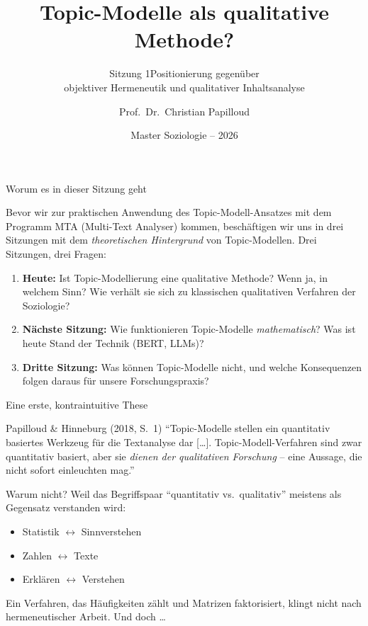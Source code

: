 \documentclass[aspectratio=169,11pt]{beamer}
\title{Topic-Modelle als qualitative Methode?}
\subtitle{Sitzung 1\mdash{}Positionierung gegenüber\\objektiver Hermeneutik und qualitativer Inhaltsanalyse}
\author{Prof.~Dr.~Christian Papilloud}
\institute{Institut für Soziologie\\Martin-Luther-Universität Halle-Wittenberg}
\date{Master Soziologie – 2026}
\let\oldemph\emph
\renewcommand{\emph}[1]{{\color{solCyan}\oldemph{#1}}}
\let\oldtextbf\textbf
\renewcommand{\textbf}[1]{{\color{solBase3}\oldtextbf{#1}}}
\begin{document}
\begin{frame}[plain]
  \titlepage
\end{frame}

\begin{frame}{Worum es in dieser Sitzung geht}

  Bevor wir zur praktischen Anwendung des Topic-Modell-Ansatzes mit
  dem Programm MTA (Multi-Text Analyser) kommen, beschäftigen wir
  uns in drei Sitzungen mit dem \emph{theoretischen Hintergrund}
  von Topic-Modellen.
  \vfill
  Drei Sitzungen, drei Fragen:
  \begin{enumerate}
    \item[\textbf{1.}] \textbf{Heute:} Ist Topic-Modellierung eine qualitative
          Methode? Wenn ja, in welchem Sinn? Wie verhält sie sich zu klassischen
          qualitativen Verfahren der Soziologie?
    \item[\textbf{2.}] \textbf{Nächste Sitzung:} Wie funktionieren Topic-Modelle
          \emph{mathematisch}? Was ist heute Stand der Technik (BERT, LLMs)?
    \item[\textbf{3.}] \textbf{Dritte Sitzung:} Was können Topic-Modelle nicht,
          und welche Konsequenzen folgen daraus für unsere Forschungspraxis?
  \end{enumerate}

\end{frame}

\begin{frame}{Eine erste, kontraintuitive These}

  \begin{block}{Papilloud \& Hinneburg (2018, S.~1)}
    \enquote{Topic-Modelle stellen ein quantitativ basiertes Werkzeug für
    die Textanalyse dar [\ldots]. Topic-Modell-Verfahren sind zwar quantitativ
    basiert, aber sie \emph{dienen der qualitativen Forschung} – eine Aussage,
    die nicht sofort einleuchten mag.}
  \end{block}

  \vfill
  Warum nicht? Weil das Begriffspaar \enquote{quantitativ vs.\ qualitativ}
  meistens als Gegensatz verstanden wird:
  \begin{itemize}
    \item Statistik $\leftrightarrow$ Sinnverstehen
    \item Zahlen $\leftrightarrow$ Texte
    \item Erklären $\leftrightarrow$ Verstehen
  \end{itemize}

  \vfill
  Ein Verfahren, das Häufigkeiten zählt und Matrizen faktorisiert,
  klingt nicht nach hermeneutischer Arbeit. Und doch \ldots\

\end{frame}
\end{document}
